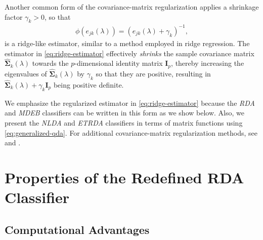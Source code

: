 \documentclass[11pt]{article}
\begin{document}
Another common form of the covariance-matrix regularization applies a shrinkage factor $\gamma_k > 0$, so that
\begin{align}
	\phi(e_{jk}(\lambda)) = (e_{jk}(\lambda) + \gamma_k)^{-1}, \label{eq:ridge-estimator}
\end{align}
is a ridge-like estimator, similar to a method employed in ridge regression. The estimator in \eqref{eq:ridge-estimator} effectively \emph{shrinks} the sample covariance matrix $\widehat{\bm\Sigma}_k(\lambda)$ towards the $p$-dimensional identity matrix $\bm I_p$, thereby increasing the eigenvalues of $\widehat{\bm\Sigma}_k(\lambda)$ by $\gamma_k$ so that they are positive, resulting in $\widehat{\bm \Sigma}_k(\lambda) + \gamma_k \bm I_p$ being positive definite.

We emphasize the regularized estimator in \eqref{eq:ridge-estimator} because the \emph{RDA} and \emph{MDEB} classifiers can be written in this form as we show below. Also, we present the \emph{NLDA} and \emph{ETRDA} classifiers in terms of matrix functions using \eqref{eq:generalized-qda}. For additional covariance-matrix regularization methods, see \cite{Ye:2009gd} and \cite{Ramey:2011ji}.

\section{Properties of the Redefined RDA Classifier}

\subsection{Computational Advantages}
\end{document}
